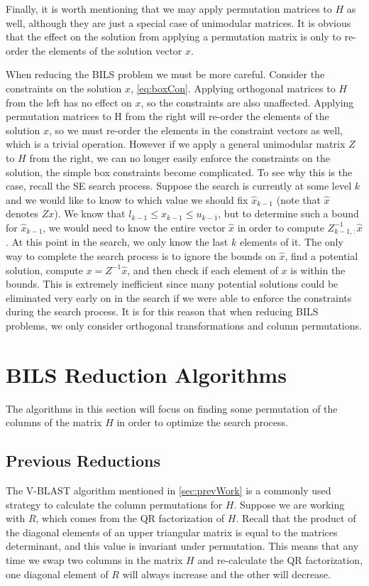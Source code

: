 \documentclass[12pt,Bold,letterpaper]{mcgilletdclass}
\begin{document}
Finally, it is worth mentioning that we may apply permutation matrices to $H$ as well, although they are just a special case of unimodular matrices. It is obvious that the effect on the solution from applying a permutation matrix is only to re-order the elements of the solution vector $x$.

When reducing the BILS problem we must be more careful. Consider the constraints on the solution $x$, \eqref{eq:boxCon}. Applying orthogonal matrices to $H$ from the left has no effect on $x$, so the constraints are also unaffected. Applying permutation matrices to H from the right will re-order the elements of the solution $x$, so we must re-order the elements in the constraint vectors as well, which is a trivial operation. However if we apply a general unimodular matrix $Z$ to $H$ from the right, we can no longer easily enforce the constraints on the solution, the simple box constraints become complicated. To see why this is the case, recall the SE search process. Suppose the search is currently at some level $k$ and we would like to know to which value we should fix $\hat{x}_{k-1}$ (note that $\hat{x}$ denotes $Zx$). We know that $l_{k-1} \le x_{k-1} \le u_{k-1}$, but to determine such a bound for $\hat{x}_{k-1}$, we would need to know the entire vector $\hat{x}$ in order to compute $Z^{-1}_{k-1,:}\hat{x}$. At this point in the search, we only know the last $k$ elements of it. The only way to complete the search process is to ignore the bounds on $\hat{x}$, find a potential solution, compute $x = Z^{-1}\hat{x}$, and then check if each element of $x$ is within the bounds. This is extremely inefficient since many potential solutions could be eliminated very early on in the search if we were able to enforce the constraints during the search process. It is for this reason that when reducing BILS problems, we only consider orthogonal transformations and column permutations.

\section{BILS Reduction Algorithms} \label{sec:BILSReduction}

The algorithms in this section will focus on finding some permutation of the columns of the matrix $H$ in order to optimize the search process.

\subsection{Previous Reductions}
The V-BLAST algorithm \cite{FosGVW99} mentioned in \ref{sec:prevWork} is a commonly used strategy to calculate the column permutations for $H$. Suppose we are working with $R$, which comes from the QR factorization of $H$. Recall that the product of the diagonal elements of an upper triangular matrix is equal to the matrices determinant, and this value is invariant under permutation. This means that any time we swap two columns in the matrix $H$ and re-calculate the QR factorization, one diagonal element of $R$ will always increase and the other will decrease.
\end{document}
